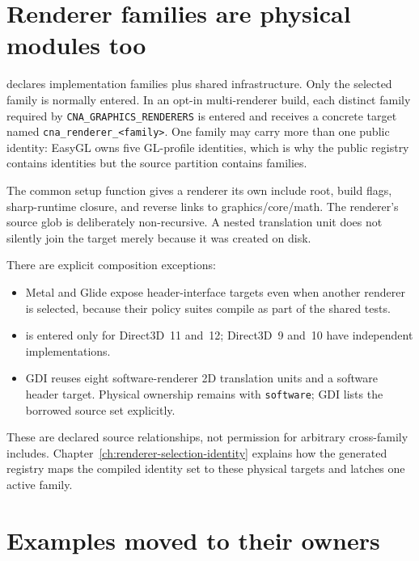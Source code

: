 \section{Renderer families are physical modules too}

 declares \RendererFamilyCount{} implementation families plus shared
infrastructure. Only the selected family is normally entered. In an opt-in multi-renderer build,
each distinct family required by \texttt{CNA\_GRAPHICS\_RENDERERS} is entered and receives a concrete target named
\texttt{cna\_renderer\_<family>}.  One family may carry more than one public identity: EasyGL owns
five GL-profile identities, which is why the public registry contains \RendererIdentityCount{}
identities but the source partition contains \RendererFamilyCount{} families.

The common setup function gives a renderer its own include root, build flags, sharp-runtime
closure, and reverse links to graphics/core/math.  The renderer's source glob is deliberately
non-recursive.  A nested translation unit does not silently join the target merely because it was
created on disk.

There are explicit composition exceptions:

\begin{itemize}
  \item Metal and Glide expose header-interface targets even when another renderer is selected,
        because their policy suites compile as part of the shared tests.
  \item {} is entered only for Direct3D~11 and~12; Direct3D~9 and~10 have
        independent implementations.
  \item GDI reuses eight software-renderer 2D translation units and a software header target.
        Physical ownership remains with \texttt{software}; GDI lists the borrowed source set
        explicitly.
\end{itemize}

These are declared source relationships, not permission for arbitrary cross-family includes.
Chapter~\ref{ch:renderer-selection-identity} explains how the generated registry maps the
compiled identity set to these physical targets and latches one active family.

\section{Examples moved to their owners}

